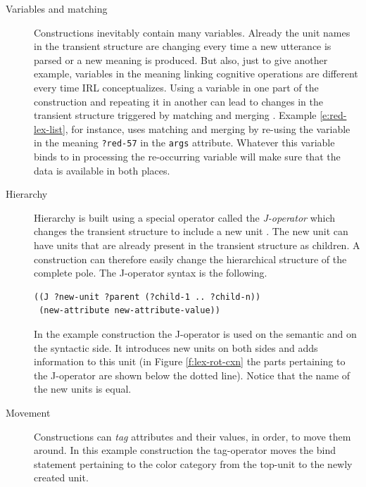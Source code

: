 \begin{description}
\item[Variables and matching] Constructions inevitably contain
many variables. Already the unit names in the transient structure
are changing every time a new utterance is parsed or a new meaning
is produced. But also, just to give another example, variables in the meaning 
linking cognitive operations are different every time IRL conceptualizes. 
Using a variable in one part of the construction and repeating it in another 
can lead to changes in the transient structure triggered
by matching and merging \citep{steels2006fcg}.
Example \ref{e:red-lex-list}, for instance, uses matching and merging
by re-using the variable in the meaning {\footnotesize\tt ?red-57}
in the {\footnotesize\tt args} attribute. Whatever this variable binds
to in processing the re-occurring variable will make sure
that the data is available in both places.
\item[Hierarchy] Hierarchy is built using a special
operator called the \emph{J-operator} which changes the
transient structure to include a new unit \citep{beule2005hierarchy}.
The new unit can have units that are already present in the 
transient structure as children. A construction can therefore 
easily change the hierarchical structure of the complete pole.
The J-operator syntax is the following.
\begin{footnotesize}
\begin{Verbatim}[commandchars=\\\{\}]
((J ?new-unit ?parent (?child-1 .. ?child-n))
 (new-attribute new-attribute-value))
\end{Verbatim}
\end{footnotesize}
In the example construction the J-operator is used on the semantic
and on the syntactic side. It introduces new units on both sides 
and adds information to this unit (in Figure \ref{f:lex-rot-cxn}
the parts pertaining to the J-operator are shown below the dotted
line). Notice that the name of the new units is equal.
\item[Movement] Constructions can \emph{tag} attributes and
their values, in order, to move them around. In this example
construction the tag-operator moves the bind statement pertaining to the
color category from the top-unit to the newly created unit.

\end{description}
